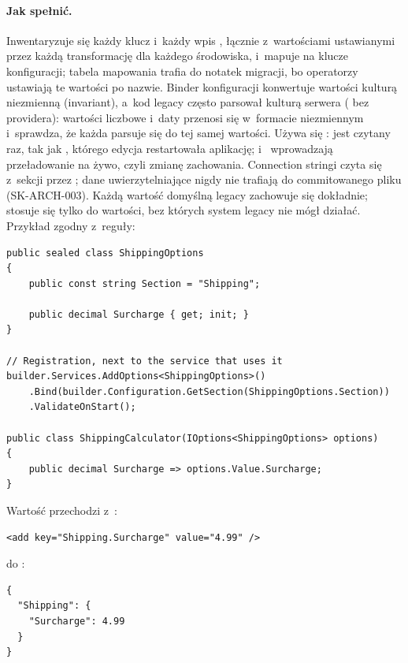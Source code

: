 \paragraph{Jak spełnić.} Inwentaryzuje się każdy klucz  i~każdy
wpis , łącznie z~wartościami ustawianymi przez każdą
transformację  dla każdego środowiska, i~mapuje na klucze konfiguracji;
tabela mapowania trafia do notatek migracji, bo operatorzy ustawiają te wartości po nazwie.
Binder konfiguracji konwertuje wartości kulturą niezmienną (invariant), a~kod legacy często
parsował kulturą serwera ( bez providera): wartości liczbowe i~daty
przenosi się w~formacie niezmiennym i~sprawdza, że każda parsuje się do tej samej wartości.
Używa się : jest czytany raz, tak jak , którego
edycja restartowała aplikację;  i~
wprowadzają przeładowanie na żywo, czyli zmianę zachowania. Connection stringi czyta się
z~sekcji  przez ; dane
uwierzytelniające nigdy nie trafiają do commitowanego pliku (SK-ARCH-003). Każdą wartość
domyślną legacy zachowuje się dokładnie;  stosuje się tylko do
wartości, bez których system legacy nie mógł działać. Przykład zgodny z~reguły:

\begin{lstlisting}
public sealed class ShippingOptions
{
    public const string Section = "Shipping";

    public decimal Surcharge { get; init; }
}

// Registration, next to the service that uses it
builder.Services.AddOptions<ShippingOptions>()
    .Bind(builder.Configuration.GetSection(ShippingOptions.Section))
    .ValidateOnStart();

public class ShippingCalculator(IOptions<ShippingOptions> options)
{
    public decimal Surcharge => options.Value.Surcharge;
}
\end{lstlisting}

Wartość przechodzi z~:

\begin{lstlisting}
<add key="Shipping.Surcharge" value="4.99" />
\end{lstlisting}

do :

\begin{lstlisting}
{
  "Shipping": {
    "Surcharge": 4.99
  }
}
\end{lstlisting}

